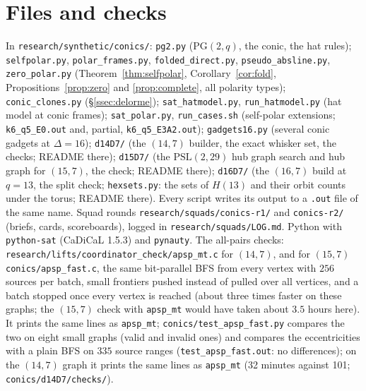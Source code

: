 \documentclass[11pt]{amsart}
\theoremstyle{definition}
\theoremstyle{remark}
\newcommand{\PG}{\mathrm{PG}}
\begin{document}
\appendix
\section{Files and checks}
In \texttt{research/synthetic/conics/}: \texttt{pg2.py} ($\PG(2,q)$, the conic, the hat rules); \texttt{selfpolar.py},
\texttt{polar\_frames.py}, \texttt{folded\_direct.py}, \texttt{pseudo\_absline.py}, \texttt{zero\_polar.py}
(Theorem~\ref{thm:selfpolar}, Corollary~\ref{cor:fold}, Propositions~\ref{prop:zero} and \ref{prop:complete}, all
polarity types); \texttt{conic\_clones.py} (\S\ref{ssec:delorme}); \texttt{sat\_hatmodel.py}, \texttt{run\_hatmodel.py}
(hat model at conic frames); \texttt{sat\_polar.py}, \texttt{run\_cases.sh} (self-polar extensions; \texttt{k6\_q5\_E0.out}
and, partial, \texttt{k6\_q5\_E3A2.out}); \texttt{gadgets16.py} (several conic gadgets at $\Delta=16$);
\texttt{d14D7/} (the $(14,7)$ builder, the exact whisker set, the checks; README there); \texttt{d15D7/} (the
$\mathrm{PSL}(2,29)$ hub graph search and hub graph for $(15,7)$, the check; README there); \texttt{d16D7/} (the $(16,7)$ build at $q=13$, the
split check; \texttt{hexsets.py}: the sets of $H(13)$ and their orbit counts under the torus; README there). Every script writes its output to
a \texttt{.out} file of the same name. Squad rounds \texttt{research/squads/conics-r1/} and \texttt{conics-r2/} (briefs,
cards, scoreboards), logged in \texttt{research/squads/LOG.md}. Python with \texttt{python-sat} (CaDiCaL 1.5.3) and
\texttt{pynauty}. The all-pairs checks: \texttt{research/lifts/coordinator\_check/apsp\_mt.c} for $(14,7)$, and for
$(15,7)$ \texttt{conics/apsp\_fast.c}, the same bit-parallel BFS from every vertex with $256$ sources per batch, small
frontiers pushed instead of pulled over all vertices, and a batch stopped once every vertex is reached (about three
times faster on these graphs; the $(15,7)$ check with \texttt{apsp\_mt} would have taken about $3.5$ hours here). It
prints the same lines as \texttt{apsp\_mt}; \texttt{conics/test\_apsp\_fast.py} compares the two on eight small graphs
(valid and invalid ones) and compares the eccentricities with a plain BFS on $335$ source ranges
(\texttt{test\_apsp\_fast.out}: no differences); on the $(14,7)$ graph it prints the same lines as \texttt{apsp\_mt}
(32 minutes against 101; \texttt{conics/d14D7/checks/}).
\end{document}

